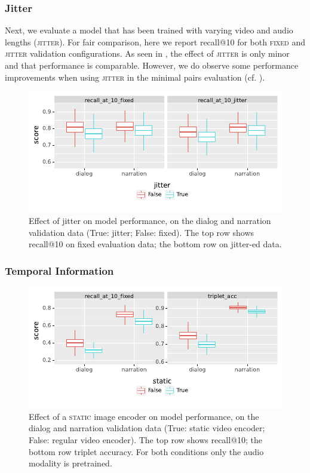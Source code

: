 \subsubsection{Jitter}
Next, we evaluate a model that has been trained with varying video and audio 
lengths (\textsc{jitter}). For fair comparison, here we report recall@10 for both 
\textsc{fixed} and \textsc{jitter} validation configurations.
As seen in , the effect of \textsc{jitter} is only
minor and that performance is comparable.
However, we do observe some 
performance improvements when using \textsc{jitter} in the
minimal pairs evaluation (cf. ).
\begin{figure}[!htb]
	\centering
	\includegraphics[width=\columnwidth]{results/ablations/jitter.pdf}
	\caption{Effect of jitter on model performance, on the dialog
          and narration validation data (True: jitter; False:
          fixed). The top row shows recall@10 on {\sc fixed}
          evaluation data; the bottom row on {\sc jitter}-ed data.}
	\label{fig:jitter}
\end{figure}



\subsubsection{Temporal Information}
\begin{figure}[htb]
  \centering
  \includegraphics[width=\columnwidth]{results/ablations/static.pdf}
  \caption{Effect of a \textsc{static} image encoder on model
    performance, on the dialog and narration validation data (True:
    static video encoder; False: regular video encoder). The top row
    shows recall@10; the bottom row triplet accuracy. For both conditions only
    the audio modality is pretrained.}
  \label{fig:static}
\end{figure}

